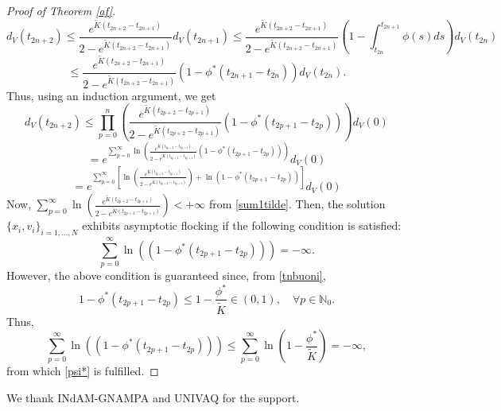 \documentclass[a4paper,11pt,oneside]{article}
\begin{document}
\begin{proof}[Proof of Theorem \ref{af}]
	$$d_V(t_{2n+2})\leq \frac{e^{\tilde K(t_{2n+2}-t_{2n+1})}}{2-e^{\tilde K(t_{2n+2}-t_{2n+1})}}d_V(t_{2n+1})\leq \frac{e^{\tilde K(t_{2n+2}-t_{2n+1})}}{2-e^{\tilde K(t_{2n+2}-t_{2n+1})}}\left(1-\int_{t_{2n}}^{t_{2n+1}}\phi(s)ds\right)d_V(t_{2n})$$
	$$\leq \frac{e^{\tilde K(t_{2n+2}-t_{2n+1})}}{2-e^{\tilde K(t_{2n+2}-t_{2n+1})}}\left(1-\phi^*(t_{2n+1}-t_{2n})\right)d_V(t_{2n}).$$
	Thus, using an induction argument, we get
	$$d_V(t_{2n+2})\leq \prod_{p=0}^{n}\left(\frac{e^{\tilde K(t_{2p+2}-t_{2p+1})}}{2-e^{\tilde K(t_{2p+2}-t_{2p+1})}}\left(1-\phi^*(t_{2p+1}-t_{2p})\right)\right)d_V(0)$$
	$$=e^{\sum_{p=0}^{\infty}\ln \left(\frac{e^{\tilde K(t_{2p+2}-t_{2p+1})}}{2-e^{\tilde K(t_{2p+2}-t_{2p+1})}}\left(1-\phi^*(t_{2p+1}-t_{2p})\right)\right)}d_V(0)$$
	$$=e^{\sum_{p=0}^{\infty}\left[\ln \left(\frac{e^{\tilde K(t_{2p+2}-t_{2p+1})}}{2-e^{\tilde K(t_{2p+2}-t_{2p+1})}}\right)+\ln\left(1-\phi^*(t_{2p+1}-t_{2p})\right)\right]}d_V(0)$$
	Now, $\sum_{p=0}^{\infty}\ln \left(\frac{e^{\tilde K(t_{2p+2}-t_{2p+1})}}{2-e^{\tilde K(t_{2p+2}-t_{2p+1})}}\right)<+\infty$ from \eqref{sum1tilde}. Then, the solution $\{x_{i},v_{i}\}_{i=1,\dots,N}$ exhibits asymptotic flocking if the following condition is satisfied:
	\begin{equation}\label{psi*}
		\sum_{p=0}^{\infty}\ln\left(\left(1-\phi^*(t_{2p+1}-t_{2p})\right)\right)=-\infty.
	\end{equation}
	However, the above condition is guaranteed since, from \eqref{tnbuoni},
	$$1-\phi^*(t_{2p+1}-t_{2p})\leq 1-\frac{\phi^*}{\tilde K}\in (0,1),\quad \forall p\in \mathbb{N}_0.$$
	Thus, $$\sum_{p=0}^{\infty}\ln\left(\left(1-\phi^*(t_{2p+1}-t_{2p})\right)\right)\leq \sum_{p=0}^{\infty}\ln\left(1-\frac{\phi^*}{\tilde K}\right)=-\infty,$$
	from which \eqref{psi*} is fulfilled.
\end{proof}

\bigskip
{} We thank INdAM-GNAMPA and UNIVAQ  for the support.
 
\end{document}
